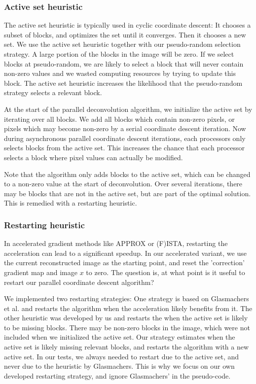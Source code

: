 \subsubsection{Active set heuristic}
The active set heuristic is typically used in cyclic coordinate descent: It chooses a subset of blocks, and optimizes the set until it converges. Then it chooses a  new set. We use the active set heuristic together with our pseudo-random selection strategy. A large portion of the blocks in the image will be zero. If we select blocks at pseudo-random, we are likely to select a block that will never contain non-zero values and we wasted computing resources by trying to update this block. The active set heuristic increases the likelihood that the pseudo-random strategy selects a relevant block. 

At the start of the parallel deconvolution algorithm, we initialize the active set by iterating over all blocks. We add all blocks which contain non-zero pixels, or pixels which may become non-zero by a serial coordinate descent iteration. Now during asynchronous parallel coordinate descent iterations, each processors only selects blocks from the active set. This increases the chance that each processor selects a block where pixel values can actually be modified.

Note that the algorithm only adds blocks to the active set, which can be changed to a non-zero value at the start of deconvolution. Over several iterations, there may be blocks that are not in the active set, but are part of the optimal solution. This is remedied with a restarting heuristic.


\subsubsection{Restarting heuristic}
In accelerated gradient methods like APPROX or (F)ISTA, restarting the acceleration can lead to a significant speedup\cite{fercoq2016restarting}. In our accelerated variant, we use the current reconstructed image as the starting point, and reset the 'correction' gradient map and image $x$ to zero. The question is, at what point is it useful to restart our parallel coordinate descent algorithm?

We implemented two restarting strategies: One strategy is based on Glasmachers et al.\cite{glasmachers2014coordinate} and restarts the algorithm when the acceleration likely benefits from it. The other heuristic was developed by us and restarts the when the active set is likely to be missing blocks. There may be non-zero blocks in the image, which were not included when we initialized the active set. Our strategy estimates when the active set is likely missing relevant blocks, and restarts the algorithm with a new active set. In our tests, we always needed to restart due to the active set, and never due to the heuristic by Glasmachers. This is why we focus on our own developed restarting strategy, and ignore Glasmachers' in the pseudo-code.

